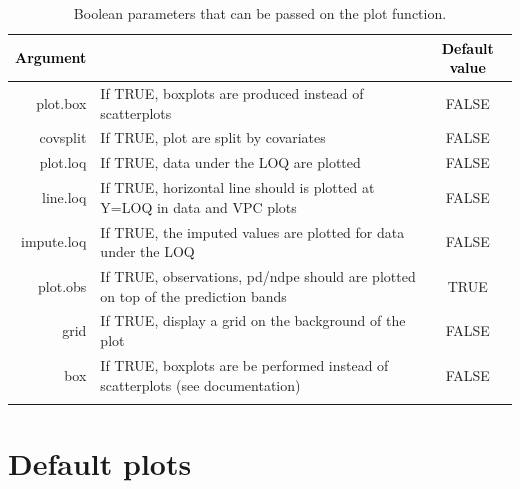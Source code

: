 \documentclass{report}
\begin{document}
\clearpage

\begin{table}[!h] 
\begin{center}
\begin{tabular}{| r p{8cm} c|}
\hline
\textbf{\textcolor{black}{Argument}} & \centering{\textbf{\textcolor{black}{Description }}} & \textbf{\textcolor{black}{Default value}} \\
\hline
 {\ttfamily plot.box } & If TRUE, boxplots are produced instead of scatterplots & FALSE \\
 {\ttfamily covsplit } & If TRUE, plot are split by covariates & FALSE \\
 {\ttfamily plot.loq } & If TRUE, data under the LOQ are plotted & FALSE \\
 {\ttfamily line.loq } & If TRUE, horizontal line should is plotted at Y=LOQ in data and VPC plots & FALSE \\
 {\ttfamily impute.loq } & If TRUE, the imputed values are plotted for data under the LOQ & FALSE \\
 {\ttfamily plot.obs } & If TRUE, observations, pd/ndpe should are plotted on top of the prediction bands & TRUE \\
 {\ttfamily grid } & If TRUE, display a grid on the background of the plot & FALSE \\
 {\ttfamily box } & If TRUE, boxplots are be performed instead of scatterplots (see documentation) & FALSE \\
{\ttfamily } & &  \\

\hline
\end{tabular} 
\end{center}
\caption{Boolean parameters that can be passed on the plot function.} \label{tab:graphicalOptions5}
\end{table} 








\section{Default plots}
\end{document}

